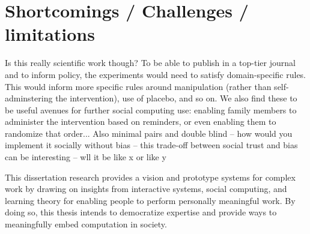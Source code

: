 \section{Shortcomings / Challenges / limitations}
Is this really scientific work though? To be able to publish in a top-tier journal and to inform policy, the experiments would need to satisfy domain-specific rules. This would inform more specific rules around manipulation (rather than self-adminstering the intervention), use of placebo, and so on. We also find these to be useful avenues for further social computing use: enabling family members to administer the intervention based on reminders, or even enabling them to randomize that order... 
	Also minimal pairs and double blind -- how would you implement it socially without bias -- this trade-off between social trust and bias can be interesting -- wll it be like x or like y




This dissertation research provides a vision and prototype systems for complex work by drawing on insights from interactive systems, social computing, and learning theory  for enabling people to perform personally meaningful work. By doing so, this thesis intends to democratize expertise and provide ways to meaningfully embed computation in society. 

